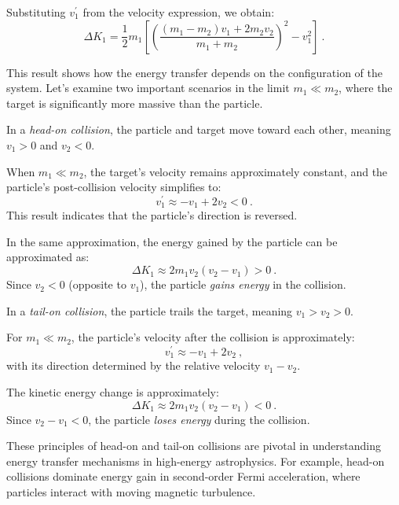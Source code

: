 Substituting \( v_1^\prime \) from the velocity expression, we obtain:  
\[
\Delta K_1 = \frac{1}{2} m_1 \left[ \left( \frac{(m_1 - m_2)v_1 + 2 m_2 v_2}{m_1 + m_2} \right)^2 - v_1^2 \right]~.
\]

This result shows how the energy transfer depends on the configuration of the system.
%
Let’s examine two important scenarios in the limit \( m_1 \ll m_2 \), where the target is significantly more massive than the particle.

In a \emph{head-on collision}, the particle and target move toward each other, meaning \( v_1 > 0 \) and \( v_2 < 0 \). 

When \( m_1 \ll m_2 \), the target’s velocity remains approximately constant, and the particle’s post-collision velocity simplifies to:  
\[
v_1^\prime \approx -v_1 + 2 v_2 <0 ~.
\]
This result indicates that the particle's direction is reversed.

In the same approximation, the energy gained by the particle can be approximated as:  
\[
\Delta K_1 \approx 2 m_1 v_2 (v_2 - v_1) > 0~.
\]
Since \( v_2 < 0 \) (opposite to \( v_1 \)), the particle \emph{gains energy} in the collision.

In a \emph{tail-on collision}, the particle trails the target, meaning \( v_1 > v_2 > 0 \). 

For \( m_1 \ll m_2 \), the particle's velocity after the collision is approximately:  
\[
v_1^\prime \approx -v_1 + 2 v_2~,
\]  
with its direction determined by the relative velocity \( v_1 - v_2 \).

The kinetic energy change is approximately:  
\[
\Delta K_1 \approx 2 m_1 v_2 (v_2 - v_1) < 0~.
\]
Since \( v_2 - v_1 < 0 \), the particle \emph{loses energy} during the collision.

These principles of head-on and tail-on collisions are pivotal in understanding energy transfer mechanisms in high-energy astrophysics. For example, head-on collisions dominate energy gain in second-order Fermi acceleration, where particles interact with moving magnetic turbulence.
